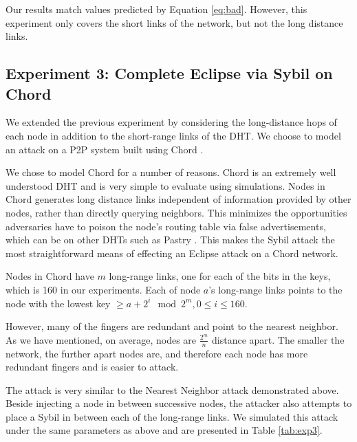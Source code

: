 Our results match values predicted by Equation \ref{eq:bad}.
However, this experiment only covers the short links of the network, but not the long distance links.




\subsection{Experiment 3: Complete Eclipse via Sybil on Chord}
\label{sec:chord}
We extended the previous experiment by considering the long-distance hops of each node in addition to the short-range links of the DHT.
We choose to model an attack on a P2P system built using Chord \cite{chord}.


We chose to model Chord for a number of reasons.
Chord is an extremely well understood DHT and is very simple to evaluate using simulations.
Nodes in Chord generates long distance links independent of information provided by other nodes, rather than directly querying neighbors.
This minimizes the opportunities adversaries have to poison the node's routing table via false advertisements, which can be on other DHTs such as Pastry \cite{pastry}. 
This makes the Sybil attack the most straightforward means of effecting an Eclipse attack on a Chord network.

Nodes in Chord have $m$ long-range links, one for each of the bits in the keys, which is 160 in our experiments.
Each of node $a$'s long-range links points to the node with the lowest key $\geq a + 2^{i} \mod 2^{m}, 0 \leq i \leq 160$.

However, many of the fingers are redundant and point to the nearest neighbor.
As we have mentioned, on average, nodes are $\frac{2^{m}}{n}$ distance apart.
The smaller the network, the further apart nodes are, and therefore each  node has more redundant fingers and is easier to attack.

The attack is very similar to the Nearest Neighbor attack demonstrated above.
Beside injecting a node in between successive nodes, the attacker also attempts to place a Sybil in between each of the long-range links.
We simulated this attack under the same parameters as above and are presented in Table \ref{tab:exp3}.


